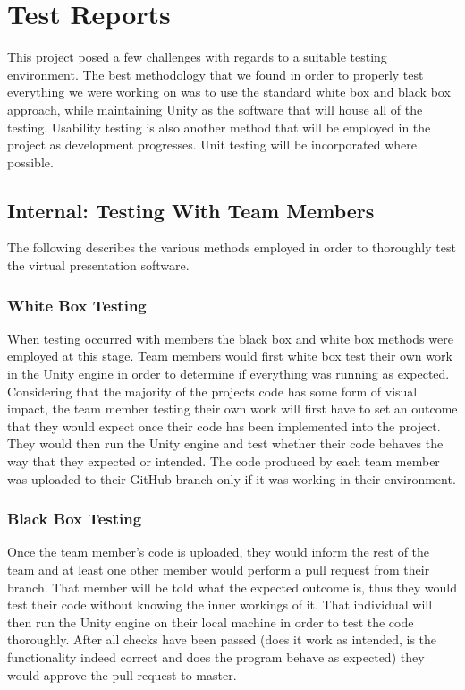 \section{Test Reports}

This project posed a few challenges with regards to a suitable testing environment. The best methodology that we found in order to properly test everything
we were working on was to use the standard white box and black box approach, while maintaining Unity as the software that will house all of the testing. Usability
testing is also another method that will be employed in the project as development progresses. Unit testing will be incorporated where possible.

	\subsection{Internal: Testing With Team Members}

	The following describes the various methods employed in order to thoroughly test the virtual presentation software.

	\subsubsection{White Box Testing}

	When testing occurred with members the black box and white box methods were employed at this stage. Team members would first white box test their own work in the
	Unity engine in order to determine if everything was running as expected. Considering that the majority of the projects code has some form of visual impact,
	the team member testing their own work will first have to set an outcome that they would expect once their code has been implemented into the project. They would
	then run the Unity engine and test whether their code behaves the way that they expected or intended. The code produced by each team member was uploaded to their
	GitHub branch only if it was working in their environment.

	\subsubsection{Black Box Testing}

	Once the team member's code is uploaded, they would inform the rest of the team and at least one other member would perform a pull request from their branch. That
	member will be told what the expected outcome is, thus they would test their code without knowing the inner workings of it. That individual will then run the Unity
	engine on their local machine in order to test the code thoroughly. After all checks have been passed (does it work as intended, is the functionality indeed
	correct and does the program behave as expected) they would approve the pull request to master.

